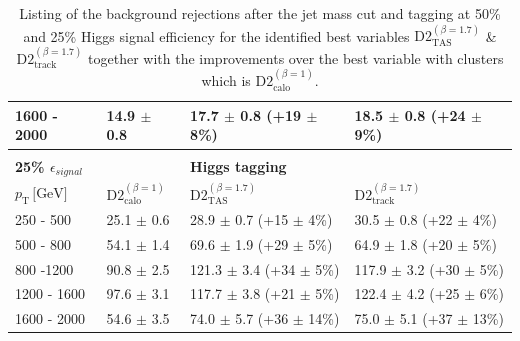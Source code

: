 \begin{table}[]
\begin{tabular}{llll}
\multicolumn{1}{l||}{1600 - 2000}                     & \multicolumn{1}{l|}{14.9 $\pm$ 0.8}                      & \multicolumn{1}{l|}{17.7 $\pm$ 0.8 (+19 $\pm$ 8\%)}       & \multicolumn{1}{l|}{18.5 $\pm$ 0.8 (+24 $\pm$ 9\%)}       \\ \hline
                                                     &                                                &                                          &                                          \\
 \multicolumn{1}{l||}{\textbf{25\% $\epsilon_{signal}$}} &                                                &      \textbf{Higgs tagging}                                    &                                          \\ \hline
\multicolumn{1}{l||}{$p_{\mathrm{T}} \, \text{[GeV]}$}           & \multicolumn{1}{l|}{$\text{D2}_{\text{calo}}^{(\beta=1)}$} & \multicolumn{1}{l|}{$\text{D2}_{\text{TAS}}^{(\beta=1.7)}$} & \multicolumn{1}{l|}{$\text{D2}_{\text{track}}^{(\beta=1.7)}$} \\ \hline \hline
\multicolumn{1}{l||}{250 - 500}                       & \multicolumn{1}{l|}{25.1 $\pm$ 0.6}                     & \multicolumn{1}{l|}{28.9 $\pm$ 0.7 (+15 $\pm$ 4\%)}        & 	\multicolumn{1}{l|}{30.5 $\pm$ 0.8 (+22 $\pm$ 4\%)}       \\
\multicolumn{1}{l||}{500 - 800}                       & \multicolumn{1}{l|}{54.1 $\pm$ 1.4}                     & \multicolumn{1}{l|}{69.6 $\pm$ 1.9 (+29 $\pm$ 5\%)}       & 	\multicolumn{1}{l|}{64.9 $\pm$ 1.8 (+20 $\pm$ 5\%)}        \\
\multicolumn{1}{l||}{800 -1200}                       & \multicolumn{1}{l|}{90.8 $\pm$ 2.5}                     & \multicolumn{1}{l|}{121.3 $\pm$ 3.4 (+34 $\pm$ 5\%)}       & 	\multicolumn{1}{l|}{117.9 $\pm$ 3.2 (+30 $\pm$ 5\%)}       \\
\multicolumn{1}{l||}{1200 - 1600}                     & \multicolumn{1}{l|}{97.6 $\pm$ 3.1}                     & \multicolumn{1}{l|}{117.7 $\pm$ 3.8 (+21 $\pm$ 5\%)}       & 	\multicolumn{1}{l|}{122.4 $\pm$ 4.2 (+25 $\pm$ 6\%)}      \\
\multicolumn{1}{l||}{1600 - 2000}                     & \multicolumn{1}{l|}{54.6 $\pm$ 3.5}                     & \multicolumn{1}{l|}{74.0 $\pm$ 5.7 (+36 $\pm$ 14\%)}      & 	\multicolumn{1}{l|}{75.0 $\pm$ 5.1 (+37 $\pm$ 13\%)}       \\ \hline
\end{tabular}
\caption{Listing of the background rejections after the jet mass cut and tagging at 50\% and 25\% Higgs signal efficiency for the identified best variables $\text{D2}_{\text{TAS}}^{(\beta=1.7)}$ \& $\text{D2}_{\text{track}}^{(\beta=1.7)}$ together with the improvements over the best variable with clusters which is $\text{D2}_{\text{calo}}^{(\beta=1)}$.}\label{table:higgs_improvement}
\end{table}

